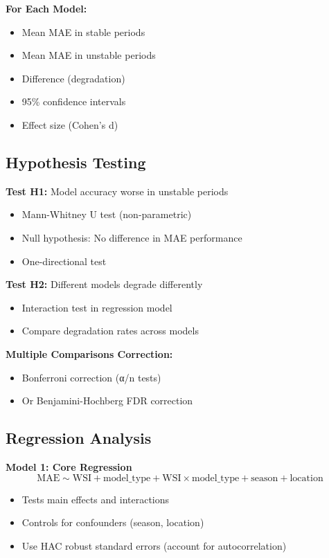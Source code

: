 \documentclass[11pt,a4paper]{article}
\begin{document}
\textbf{For Each Model:}
\begin{itemize}
    \item Mean MAE in stable periods
    \item Mean MAE in unstable periods
    \item Difference (degradation)
    \item 95\% confidence intervals
    \item Effect size (Cohen's d)
\end{itemize}

\subsection{Hypothesis Testing}

\textbf{Test H1:} Model accuracy worse in unstable periods
\begin{itemize}
    \item Mann-Whitney U test (non-parametric)
    \item Null hypothesis: No difference in MAE performance
    \item One-directional test
\end{itemize}

\textbf{Test H2:} Different models degrade differently
\begin{itemize}
    \item Interaction test in regression model
    \item Compare degradation rates across models
\end{itemize}

\textbf{Multiple Comparisons Correction:}
\begin{itemize}
    \item Bonferroni correction (α/n tests)
    \item Or Benjamini-Hochberg FDR correction
\end{itemize}

\subsection{Regression Analysis}

\textbf{Model 1: Core Regression}
\begin{equation}
\text{MAE} \sim \text{WSI} + \text{model\_type} + \text{WSI} \times \text{model\_type} + \text{season} + \text{location}
\end{equation}

\begin{itemize}
    \item Tests main effects and interactions
    \item Controls for confounders (season, location)
    \item Use HAC robust standard errors (account for autocorrelation)
\end{itemize}
\end{document}
